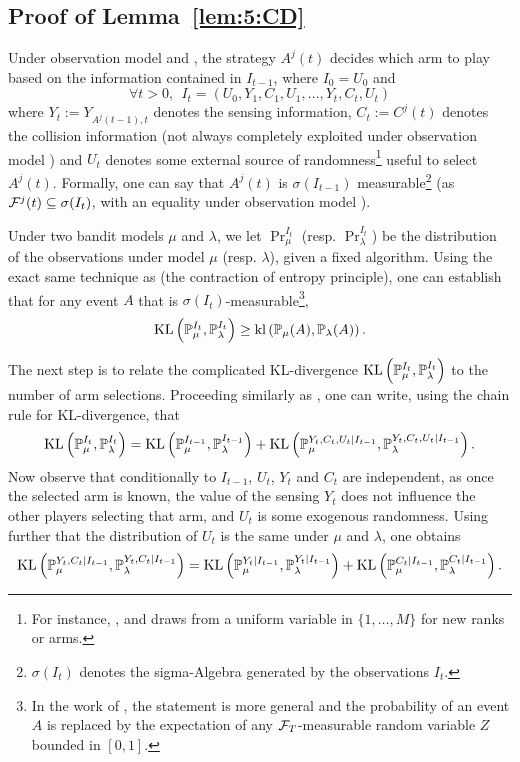 
\subsection{Proof of Lemma~\ref{lem:5:CD}}

Under observation model \modelun{} and \modeldeux, the strategy $A^j(t)$ decides which arm to play based on the information contained in $I_{t-1}$, where $I_0 = U_0$ and
\[\forall t > 0, \ \ I_t = (U_0,Y_1,C_1,U_1,\dots,Y_t,C_t,U_t)\]
where $Y_{t} := Y_{A^j(t-1),t}$ denotes the sensing information, $C_t := C^j(t)$ denotes the collision information (not always completely exploited under observation model \modeldeux) and $U_t$ denotes some external source of randomness\footnote{For instance, \MCTopM, \RandTopM{} and \rhoRand{} draws from a uniform variable in $\{1,\dots,M\}$ for new ranks or arms.} useful to select $A^j(t)$.
Formally, one can say that $A^j(t)$ is $\sigma(I_{t-1})$ measurable\footnote{$\sigma(I_t)$ denotes the sigma-Algebra generated by the observations $I_t$.} (as $\mathcal{F}^j(t) \subseteq \sigma(I_{t})$, with an equality under observation model \modelun).

Under two bandit models $\mu$ and $\lambda$, we let $\Pr_{\mu}^{I_t}$ (resp. $\Pr_{\lambda}^{I_t}$) be the distribution of the observations under model $\mu$ (resp. $\lambda$), given a fixed algorithm.
Using the exact same technique as \cite{Garivier16TrueShape} (the contraction of entropy principle), one can establish that for any event $A$ that is $\sigma(I_t)$-measurable\footnote{In the work of \cite{Garivier16TrueShape}, the statement is more general and the probability of an event $A$ is replaced by the expectation of any $\mathcal{F}_T$-measurable random variable $Z$ bounded in $[0,1]$.},
\[\mathrm{KL}\left(\mathbb{P}_{\mu}^{I_t},\mathbb{P}_{\lambda}^{I_t}\right) \geq \mathrm{kl}\left(\mathbb{P}_{\mu}(A),\mathbb{P}_{\lambda}(A)\right).\]

The next step is to relate the complicated KL-divergence $\mathrm{KL}\left(\mathbb{P}_{\mu}^{I_t},\mathbb{P}_{\lambda}^{I_t}\right)$ to the number of arm selections.
Proceeding similarly as \cite{Garivier16TrueShape}, one can write, using the chain rule for KL-divergence, that
\begin{equation}\label{eq:5:Iterative}\mathrm{KL}\left(\mathbb{P}_{\mu}^{I_{t}},\mathbb{P}_{\lambda}^{I_{t}}\right) =  \mathrm{KL}\left(\mathbb{P}_{\mu}^{I_{t-1}},\mathbb{P}_{\lambda}^{I_{t-1}}\right) + \mathrm{KL}\left(\mathbb{P}_{\mu}^{Y_{t},C_t,U_t | I_{t-1}},\mathbb{P}_{\lambda}^{Y_{t},C_t,U_t | I_{t-1}}\right).\end{equation}
Now observe that conditionally to $I_{t-1}$, $U_t$, $Y_t$ and $C_t$ are independent, as once the selected arm is known, the value of the sensing $Y_t$ does not influence the other players selecting that arm, and $U_t$ is some exogenous randomness.
Using further that the distribution of $U_t$ is the same under $\mu$ and $\lambda$, one obtains
\begin{equation}\mathrm{KL}\left(\mathbb{P}_{\mu}^{Y_{t},C_t | I_{t-1}},\mathbb{P}_{\lambda}^{Y_{t},C_t | I_{t-1}}\right) =
 \mathrm{KL}\left(\mathbb{P}_{\mu}^{Y_{t}| I_{t-1}},\mathbb{P}_{\lambda}^{Y_{t}| I_{t-1}}\right) + \mathrm{KL}\left(\mathbb{P}_{\mu}^{C_t | I_{t-1}},\mathbb{P}_{\lambda}^{C_t | I_{t-1}}\right).\label{eq:5:DecKL}
\end{equation}

